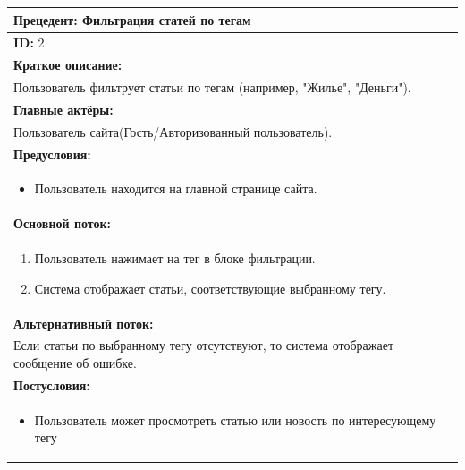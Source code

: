 \documentclass{scrreprt}
\begin{document}
\vspace{10px}
\noindent
\begin{tabularx}{\textwidth}{|X|}
	\hline
	\textbf{Прецедент: Фильтрация статей по тегам} \\
	\hline
	\textbf{ID:} 2 \\
	\hline
	\textbf{Краткое описание:} \\
	Пользователь фильтрует статьи по тегам (например, "Жилье", "Деньги"). \\
	\hline
	\textbf{Главные актёры:} \\
	Пользователь сайта(Гость/Авторизованный пользователь). \\
	\hline
	\textbf{Предусловия:} \\
	\begin{itemize}[nosep,leftmargin=*]
		\item Пользователь находится на главной странице сайта.
	\end{itemize} \\
	\hline
	\textbf{Основной поток:} \\
	\begin{enumerate}[nosep,leftmargin=*]
		\item Пользователь нажимает на тег в блоке фильтрации.
		\item Система отображает статьи, соответствующие выбранному тегу.
	\end{enumerate} \\
	\hline
	\textbf{Альтернативный поток:} \\
	Если статьи по выбранному тегу отсутствуют, то система отображает сообщение об ошибке. \\
	\hline
	\textbf{Постусловия:} \\
	\begin{itemize}[nosep,leftmargin=*]
		\item Пользователь может просмотреть статью или новость по интересующему тегу
	\end{itemize} \\
	\hline
\end{tabularx}
\end{document}
